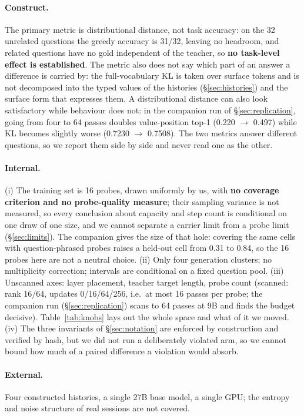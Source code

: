 \documentclass[sigconf,nonacm]{acmart}
\begin{document}
\paragraph{Construct.} The primary metric is distributional distance, not task accuracy: on the 32
unrelated questions the greedy accuracy is 31/32, leaving no headroom, and related questions have no gold
independent of the teacher, so \textbf{no task-level effect is established}. The metric also does not say which
part of an answer a difference is carried by: the full-vocabulary KL is taken over surface tokens and is not
decomposed into the typed values of the histories (\S\ref{sec:histories}) and the surface form that expresses
them. A distributional distance can also look satisfactory while behaviour does not: in the companion run of
\S\ref{sec:replication}, going from four to 64 passes doubles value-position top-1 (0.220 $\to$ 0.497) while KL
becomes slightly worse (0.7230 $\to$ 0.7508). The two metrics answer different questions, so we report them side
by side and never read one as the other.
\paragraph{Internal.} (i) The training set is 16 probes, drawn uniformly by us, with \textbf{no coverage
criterion and no probe-quality measure}; their sampling variance is not measured, so every conclusion about
capacity and step count is conditional on one draw of one size, and we cannot separate a carrier limit from a
probe limit (\S\ref{sec:limits}). The companion gives the size of that hole: covering the same cells with
question-phrased probes raises a held-out cell from 0.31 to 0.84, so the 16 probes here are not a neutral choice.
(ii) Only four
generation clusters; no multiplicity correction; intervals are conditional on a fixed question pool. (iii)
Unscanned axes: layer placement, teacher target length, probe count (scanned: rank 16/64, updates 0/16/64/256,
i.e.\ at most 16 passes per probe; the companion run (\S\ref{sec:replication}) scans to 64 passes at 9B and finds the budget
decisive). Table~\ref{tab:knobs} lays out the whole space and what of it we moved.
(iv) The three invariants of \S\ref{sec:notation} are enforced by construction and verified by hash, but we did
not run a deliberately violated arm, so we cannot bound how much of a paired difference a violation would
absorb.
\paragraph{External.} Four constructed histories, a single 27B base model, a single GPU; the entropy and noise
structure of real sessions are not covered.
\end{document}
